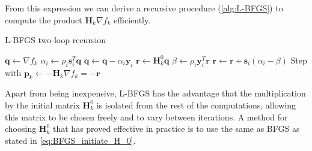 From this expression we can derive a recursive procedure (\cref{alg:L-BFGS}) to compute the product $\textbf{H}_{k} \nabla f_k$ efficiently.

\begin{algorithm}[H]
  \caption{L-BFGS two-loop recursion \cite{Nocedal2006}}\label{alg:L-BFGS}
  \begin{algorithmic}
    \State $\textbf{q} \gets \nabla f_k$
    \State $\alpha_i \gets \rho_i \textbf{s}_i^T \textbf{q}$
    \State $ \textbf{q} \gets \textbf{q} - \alpha_i\textbf{y}_i$
    \EndFor
    \State $\textbf{r}\gets \textbf{H}_k^0 \textbf{q}$
    \State $\beta \gets \rho_i \textbf{y}_i^T \textbf{r}$
    \State $ \textbf{r} \gets \textbf{r} +\textbf{s}_i (\alpha_i-\beta)$
    \EndFor
    \State Step with $\textbf{p}_k \gets -\textbf{H}_k \nabla f_{k} = -\textbf{r}$
  \end{algorithmic}
\end{algorithm}

Apart from being inexpensive, L-BFGS has the advantage that the multiplication by the initial matrix $\textbf{H}_k^0$ is isolated from the rest of the computations, allowing this matrix to be chosen freely and to vary between iterations. A method for choosing $\textbf{H}_k^0$ that has proved effective in practice is to use the same as BFGS as stated in \cref{eq:BFGS_initiate_H_0}. \cite{Nocedal2006}

